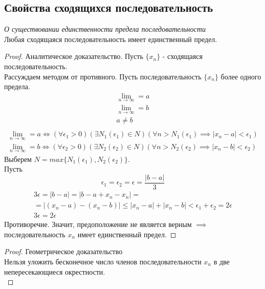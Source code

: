 
\subsection{Свойства сходящихся последовательность}

\begin{theorem}
  \textit{О существовании единственности предела последовательности} \\
  Любая сходящаяся последовательность имеет единственный предел.
\end{theorem}
\begin{proof} Аналитическое доказательство.
  Пусть $\{x_{n}\} $ - сходящаяся последовательность. \\
  Рассуждаем методом от противного. Пусть последовательность $\{x_{n}\} $ более одного предела.
  \begin{gather*}
    \lim_{n \to \infty} = a \\
    \lim_{n \to \infty} = b \\
    a \neq b \\
  \end{gather*}
  \begin{gather}
    \lim_{n \to \infty} = a \iff (\forall \epsilon_1 > 0)(\exists N_1(\epsilon_1) \in N)(\forall n > N_1(\epsilon_1) \implies |x_{n} - a| < \epsilon_1) \\
    \lim_{n \to \infty} = b \iff (\forall \epsilon_2 > 0)(\exists N_2(\epsilon_2) \in N)(\forall n > N_2(\epsilon_2) \implies |x_{n} - b| < \epsilon_2)  
  \end{gather} 
  Выберем $N=max \{N_1\left( \epsilon_1 \right) , N_2\left( \epsilon_2 \right) \}$. \\
  Пусть 
  \[
    \epsilon_1 = \epsilon_2 = \epsilon = \frac{|b - a|}{3}
  \]
  \begin{gather*}
  3 \epsilon = |b - a| = |b - a + x_{n} - x_{n}| = \\
  = |(x_{n} - a) - (x_{n} - b)| \le |x_{n} - a| + |x_{n} - b| < \epsilon_1 + \epsilon_2 = 2 \epsilon \\
  3 \epsilon = 2 \epsilon
  \end{gather*}
  Противоречие. Значит, предоположение не является верным $\implies$ последовательность $x_{n}$ имеет единственный предел.
\end{proof}

\begin{proof} Геометрическое доказательство\\
  Нельзя уложить бесконечное число членов последовательности $x_{n}$ в две непересекающиеся окрестности. \\
\end{proof}

